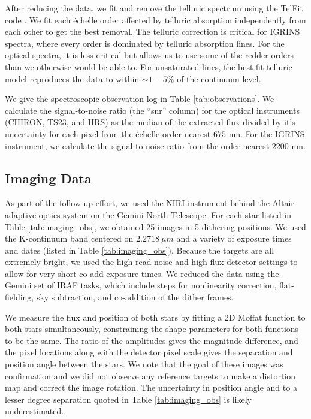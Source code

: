 \documentclass{emulateapj}
\begin{document}
After reducing the data, we fit and remove the telluric spectrum using the TelFit code \citep{Gullikson2014}. We fit each \'echelle order affected by telluric absorption independently from each other to get the best removal. The telluric correction is critical for IGRINS spectra, where every order is dominated by telluric absorption lines. For the optical spectra, it is less critical but allows us to use some of the redder orders than we otherwise would be able to. For unsaturated lines, the best-fit telluric model reproduces the data to within $\sim 1-5\%$ of the continuum level.

We give the spectroscopic observation log in Table \ref{tab:observations}. We calculate the signal-to-noise ratio (the ``snr'' column) for the optical instruments (CHIRON, TS23, and HRS) as the median of the extracted flux divided by it's uncertainty for each pixel from the \'echelle order nearest $675$ nm. For the IGRINS instrument, we calculate the signal-to-noise ratio from the order nearest $2200$ nm.


\subsection{Imaging Data}
As part of the follow-up effort, we used the NIRI instrument behind the Altair adaptive optics system on the Gemini North Telescope. For each star listed in Table \ref{tab:imaging_obs}, we obtained 25 images in 5 dithering positions. We used the K-continuum band centered on $2.2718\ \mu m$ and a variety of exposure times and dates (listed in Table \ref{tab:imaging_obs}). Because the targets are all extremely bright, we used the high read noise and high flux detector settings to allow for very short co-add exposure times. We reduced the data using the Gemini set of IRAF tasks, which include steps for nonlinearity correction, flat-fielding, sky subtraction, and co-addition of the dither frames. 

We measure the flux and position of both stars by fitting a 2D Moffat function \citep{Moffat1969} to both stars simultaneously, constraining the shape parameters for both functions to be the same. The ratio of the amplitudes gives the magnitude difference, and the pixel locations along with the detector pixel scale gives the separation and position angle between the stars. We note that the goal of these images was confirmation and we did not observe any reference targets to make a distortion map and correct the image rotation. The uncertainty in position angle and to a lesser degree separation quoted in Table \ref{tab:imaging_obs} is likely underestimated.
\end{document}
